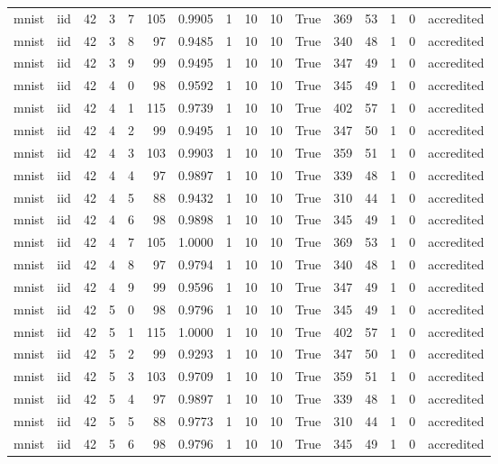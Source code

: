 \begin{tabular}{llrrrrrrrrrrrrrl}
mnist & iid & 42 & 3 & 7 & 105 & 0.9905 & 1 & 10 & 10 & True & 369 & 53 & 1 & 0 & accredited \\
mnist & iid & 42 & 3 & 8 & 97 & 0.9485 & 1 & 10 & 10 & True & 340 & 48 & 1 & 0 & accredited \\
mnist & iid & 42 & 3 & 9 & 99 & 0.9495 & 1 & 10 & 10 & True & 347 & 49 & 1 & 0 & accredited \\
mnist & iid & 42 & 4 & 0 & 98 & 0.9592 & 1 & 10 & 10 & True & 345 & 49 & 1 & 0 & accredited \\
mnist & iid & 42 & 4 & 1 & 115 & 0.9739 & 1 & 10 & 10 & True & 402 & 57 & 1 & 0 & accredited \\
mnist & iid & 42 & 4 & 2 & 99 & 0.9495 & 1 & 10 & 10 & True & 347 & 50 & 1 & 0 & accredited \\
mnist & iid & 42 & 4 & 3 & 103 & 0.9903 & 1 & 10 & 10 & True & 359 & 51 & 1 & 0 & accredited \\
mnist & iid & 42 & 4 & 4 & 97 & 0.9897 & 1 & 10 & 10 & True & 339 & 48 & 1 & 0 & accredited \\
mnist & iid & 42 & 4 & 5 & 88 & 0.9432 & 1 & 10 & 10 & True & 310 & 44 & 1 & 0 & accredited \\
mnist & iid & 42 & 4 & 6 & 98 & 0.9898 & 1 & 10 & 10 & True & 345 & 49 & 1 & 0 & accredited \\
mnist & iid & 42 & 4 & 7 & 105 & 1.0000 & 1 & 10 & 10 & True & 369 & 53 & 1 & 0 & accredited \\
mnist & iid & 42 & 4 & 8 & 97 & 0.9794 & 1 & 10 & 10 & True & 340 & 48 & 1 & 0 & accredited \\
mnist & iid & 42 & 4 & 9 & 99 & 0.9596 & 1 & 10 & 10 & True & 347 & 49 & 1 & 0 & accredited \\
mnist & iid & 42 & 5 & 0 & 98 & 0.9796 & 1 & 10 & 10 & True & 345 & 49 & 1 & 0 & accredited \\
mnist & iid & 42 & 5 & 1 & 115 & 1.0000 & 1 & 10 & 10 & True & 402 & 57 & 1 & 0 & accredited \\
mnist & iid & 42 & 5 & 2 & 99 & 0.9293 & 1 & 10 & 10 & True & 347 & 50 & 1 & 0 & accredited \\
mnist & iid & 42 & 5 & 3 & 103 & 0.9709 & 1 & 10 & 10 & True & 359 & 51 & 1 & 0 & accredited \\
mnist & iid & 42 & 5 & 4 & 97 & 0.9897 & 1 & 10 & 10 & True & 339 & 48 & 1 & 0 & accredited \\
mnist & iid & 42 & 5 & 5 & 88 & 0.9773 & 1 & 10 & 10 & True & 310 & 44 & 1 & 0 & accredited \\
mnist & iid & 42 & 5 & 6 & 98 & 0.9796 & 1 & 10 & 10 & True & 345 & 49 & 1 & 0 & accredited \\

\end{tabular}
